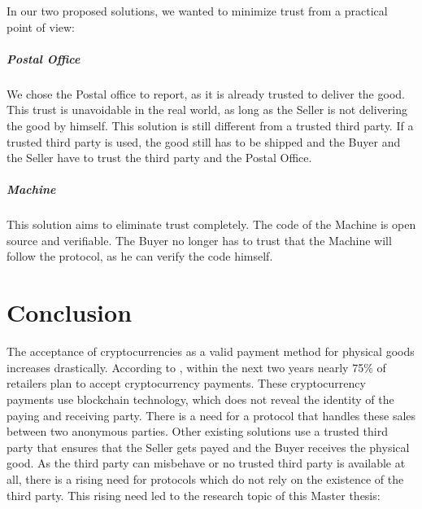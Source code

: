 \documentclass{cacthesis}
\begin{document}
In our two proposed solutions, we wanted to minimize trust from a practical point of view:
\paragraph{Postal Office}
We chose the Postal office to report, as it is already trusted to deliver the good. 
This trust is unavoidable in the real world, as long as the Seller is not delivering the good by himself. This solution is still different from a trusted third party. If a trusted third party is used, the good still has to be shipped and the Buyer and the Seller have to trust the third party and the Postal Office.

\paragraph{Machine}
This solution aims to eliminate trust completely. The code of the Machine is open source and verifiable. The Buyer no longer has to trust that the Machine will follow the protocol, as he can verify the code himself.

\chapter{Conclusion}
\label{cha:conclusion}
The acceptance of cryptocurrencies as a valid payment method for physical goods increases drastically. According to \cite{crypto-acceptance}, within the next two years nearly 75\% of retailers plan to accept cryptocurrency payments. These cryptocurrency payments use blockchain technology, which does not reveal the identity of the paying and receiving party. There is a need for a protocol that handles these sales between two anonymous parties. Other existing solutions use a trusted third party that ensures that the Seller gets payed and the Buyer receives the physical good. As the third party can misbehave or no trusted third party is available at all, there is a rising need for protocols which do not rely on the existence of the third party. This rising need led to the research topic of this Master thesis:\newline
\end{document}
